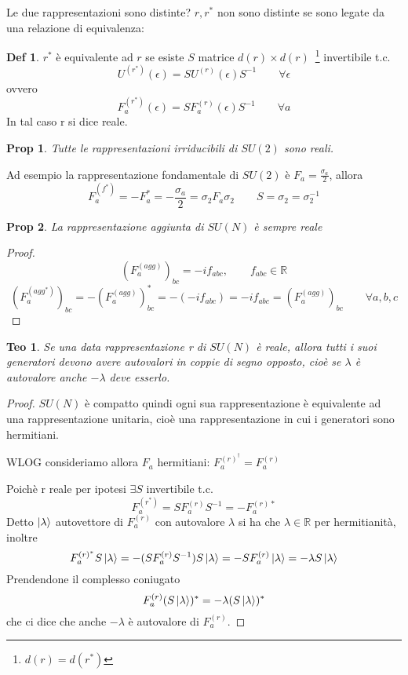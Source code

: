 \documentclass[10pt,a4paper]{article}
\newtheorem{thm}{Teo}[section]
\newtheorem{prop}{Prop}[section]
\theoremstyle{definition}
\newtheorem{definition}{Def}[section]
\begin{document}
Le due rappresentazioni sono distinte? $r, r^*$ non sono distinte se sono legate da una relazione di equivalenza:
\begin{definition}
    $r^*$ è equivalente ad $r$ se esiste $S$ matrice $d(r) \times d(r)$~\footnote{$d(r) = d(r^*)$} invertibile t.c.
    \[
    U^{(r^*)}(\epsilon) = S U^{(r)}(\epsilon)S^{-1}   \qquad \forall \epsilon
    \]
    ovvero
    \[
        F_a^{(r^*)}(\epsilon) = S F_a^{(r)}(\epsilon)S^{-1}   \qquad \forall a
    \]
    In tal caso r si dice reale.
\end{definition}

\begin{prop}
    Tutte le rappresentazioni irriducibili di $SU(2)$ sono reali.
\end{prop}

Ad esempio la rappresentazione fondamentale di $SU(2)$ è $F_a = \frac{\sigma_a}{2}$, allora
\[
F_a^{(f^*)} = -F_a^* = - \frac{\sigma_a}{2} = \sigma_2 F_a \sigma_2\qquad S = \sigma_2 = \sigma_2^{-1}
\]
\begin{prop}
    La rappresentazione aggiunta di $SU(N)$ è sempre reale
\end{prop}
\begin{proof}
    \[(F_a^{(agg)})_{bc} = -if_{abc}, \qquad f_{abc} \in \mathbb{R}\]
    \[
        (F_a^{(agg^*)})_{bc} = -(F_a^{(agg)})^*_{bc} = -(-i f_{abc}) = -if_{abc} = (F_a^{(agg)})_{bc} \qquad \forall a,b,c 
    \]

\end{proof}
\begin{thm}
    Se una data rappresentazione r di $SU(N)$ è reale, allora tutti i suoi generatori devono avere autovalori in coppie di segno opposto, cioè se $\lambda$ è autovalore anche $-\lambda$ deve esserlo.
\end{thm}
\begin{proof}
    $SU(N)$ è compatto quindi ogni sua rappresentazione è equivalente ad una rappresentazione unitaria, cioè una rappresentazione in cui i generatori sono hermitiani.

    WLOG consideriamo allora $F_a$ hermitiani: $F_a^{(r)^\dagger} = F_a^{(r)}$

    Poichè r reale per ipotesi $\exists S$ invertibile t.c.
    \[
        F_a^{(r^*)} = S F_a^{(r)}S^{-1} = - F_a^{(r)*}  
    \]
    Detto $\ket{\lambda}$ autovettore di $F_a^{(r)}$ con autovalore $\lambda$ si ha che $\lambda \in \mathbb{R}$ per hermitianità, inoltre
    \[
        F_a^{(r)^*}S\ket{\lambda} = - (S F_a^{(r)}S^{-1})S\ket{\lambda} = -S F_a^{(r)}\ket{\lambda} = -\lambda S\ket{\lambda} 
    \]
    Prendendone il complesso coniugato 
    \[
    F_a^{(r)}(S\ket{\lambda})^* = -\lambda(S\ket{\lambda})^*    
    \]
    che ci dice che anche $-\lambda$ è autovalore di $F_a^{(r)}$.
    
\end{proof}
\end{document}
